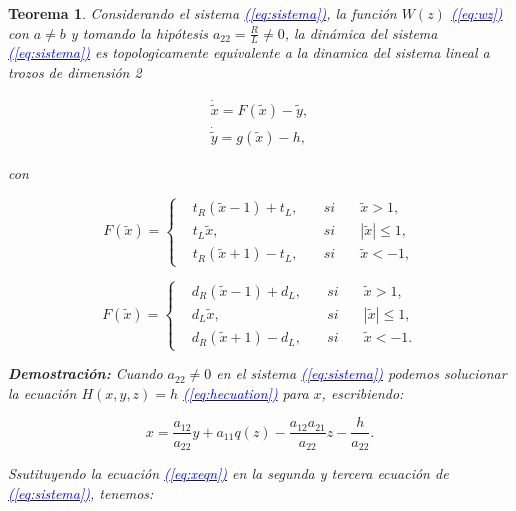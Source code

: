 \documentclass[12pt,a4paper]{report} %
\newtheorem{theorem}{Teorema}
\newcommand{\eref}[1]{\hyperref[#1]{\textcolor{blue}{\textit{(\ref*{#1})}}}}
\begin{document}
	\begin{theorem}
		Considerando el sistema \eref{eq:sistema}, la función $W(z)$ \eref{eq:wz} con $a\neq b$ y tomando la hipótesis $a_{22}=\frac{R}{L}\neq 0$, la dinámica del sistema \eref{eq:sistema} es topologicamente equivalente a la dinamica del sistema lineal a trozos de dimensión 2
		
		\begin{equation}
			\label{eq:sis2ec}
			\begin{gathered}
				\dot{\tilde{x}}=F(\tilde{x})-\tilde{y}, \\[2mm]
				\dot{\tilde{y}}=g(\tilde{x})-h,
			\end{gathered}
		\end{equation}
		
		con
		
		\begin{equation}
			\label{f1}
			F(\tilde{x})=
			\left\{
			\begin{aligned}
				&t_R(\tilde{x}-1)+t_L, \quad &si& \quad \tilde{x}>1,\\
				&t_L\tilde{x}, &si& \quad |\tilde{x}|\leq 1,\\
				&t_R(\tilde{x}+1)-t_L, \quad &si& \quad \tilde{x}<-1,
			\end{aligned}
			\right.
		\end{equation}\smallskip
		
		\begin{equation}
			\label{eq:g1}
			F(\tilde{x})=
			\left\{
			\begin{aligned}
				&d_R(\tilde{x}-1)+d_L, \quad &si& \quad \tilde{x}>1,\\
				&d_L\tilde{x}, &si& \quad |\tilde{x}|\leq 1,\\
				&d_R(\tilde{x}+1)-d_L, \quad &si& \quad \tilde{x}<-1.
			\end{aligned}
			\right.
		\end{equation}\smallskip
		
		\vspace{0.5cm}\noindent \textbf{Demostración:} Cuando $a_{22}\neq0$ en el sistema \eref{eq:sistema} podemos solucionar la ecuación $H(x,y,z)=h$ \eref{eq:hecuation} para $x$, escribiendo:
		
		\begin{equation}
			\label{eq:xeqn}
			x=\frac{a_{12}}{a_{22}}y+a_{11}q(z)-\frac{a_{12}a_{21}}{a_{22}}z-\frac{h}{a_{22}}.
		\end{equation}\smallskip
		
		Ssutituyendo la ecuación \eref{eq:xeqn} en la segunda y tercera ecuación de \eref{eq:sistema}, tenemos:
		

\end{theorem}
\end{document}
